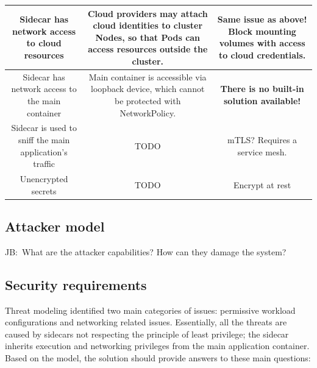 \documentclass[english, 12pt, a4paper, sci, utf8, a-2b, online]{aaltothesis}
\newcommand{\mycomment}[3]{\textcolor{#1}{#2:~#3}}
\newcommand{\jb}[1]{\noindent\mycomment{aaltoRed}{JB}{#1}}
\begin{document}
\begin{table}[H]
\begin{minipage}{\textwidth}
\begin{tabularx}{\textwidth}{CCC}
    Sidecar has network access to cloud resources & Cloud providers may attach cloud identities to cluster Nodes, so that Pods can access resources outside the cluster. & \textbf{Same issue as above!} Block mounting volumes with access to cloud credentials. \\ \hline
    Sidecar has network access to the main container & Main container is accessible via loopback device, which cannot be protected with NetworkPolicy. & \textbf{There is no built-in solution available!} \\ \hline
    Sidecar is used to sniff the main application's traffic & TODO & mTLS? Requires a service mesh. \\ \hline
    Unencrypted secrets & TODO & Encrypt at rest \\ \hline
  \end{tabularx}
\end{minipage}
\end{table}

\subsection{Attacker model}
\jb{What are the attacker capabilities? How can they damage the system?}

\subsection{Security requirements}

Threat modeling identified two main categories of issues: permissive workload configurations and networking related issues.
Essentially, all the threats are caused by sidecars not respecting the principle of least privilege; the sidecar inherits execution and networking privileges from the main application container.
Based on the model, the solution should provide answers to these main questions:

\end{document}
